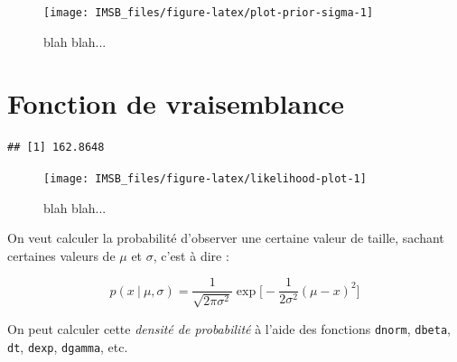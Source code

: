\documentclass[
  a4paper,11pt,twoside,onecolumn,openright,final,oldfontcommands]{memoir}
\newenvironment{Shaded}{\begin{snugshade}}{\end{snugshade}}
\newcommand{\CommentTok}[1]{\textcolor[rgb]{0.56,0.35,0.01}{\textit{#1}}}
\newcommand{\DecValTok}[1]{\textcolor[rgb]{0.00,0.00,0.81}{#1}}
\newcommand{\FloatTok}[1]{\textcolor[rgb]{0.00,0.00,0.81}{#1}}
\newcommand{\FunctionTok}[1]{\textcolor[rgb]{0.00,0.00,0.00}{#1}}
\newcommand{\NormalTok}[1]{#1}
\newcommand{\OtherTok}[1]{\textcolor[rgb]{0.56,0.35,0.01}{#1}}
\newcommand{\SpecialCharTok}[1]{\textcolor[rgb]{0.00,0.00,0.00}{#1}}
\theoremstyle{definition}
\theoremstyle{definition}
\theoremstyle{definition}
\theoremstyle{definition}
\theoremstyle{remark}
\begin{document}
\begin{figure}[!htb]

{\centering \texttt{[image: IMSB\_files/figure-latex/plot-prior-sigma-1]} 

}

\caption{blah blah...}\label{fig:plot-prior-sigma}
\end{figure}

\hypertarget{fonction-de-vraisemblance}{%
\section{Fonction de vraisemblance}\label{fonction-de-vraisemblance}}

\begin{Shaded}
\end{Shaded}

\begin{verbatim}
## [1] 162.8648
\end{verbatim}

\begin{figure}[!htb]

{\centering \texttt{[image: IMSB\_files/figure-latex/likelihood-plot-1]} 

}

\caption{blah blah...}\label{fig:likelihood-plot}
\end{figure}

On veut calculer la probabilité d'observer une certaine valeur de taille, sachant certaines valeurs de \(\mu\) et \(\sigma\), c'est à dire :

\[
p(x \ | \ \mu, \sigma) = \frac{1}{\sqrt{2 \pi \sigma^{2}}} \exp \bigg[-\frac{1}{2 \sigma^{2}} (\mu - x)^{2} \bigg]
\]

On peut calculer cette \emph{densité de probabilité} à l'aide des fonctions \texttt{dnorm}, \texttt{dbeta}, \texttt{dt}, \texttt{dexp}, \texttt{dgamma}, etc.

\begin{Shaded}
\end{Shaded}
\end{document}
